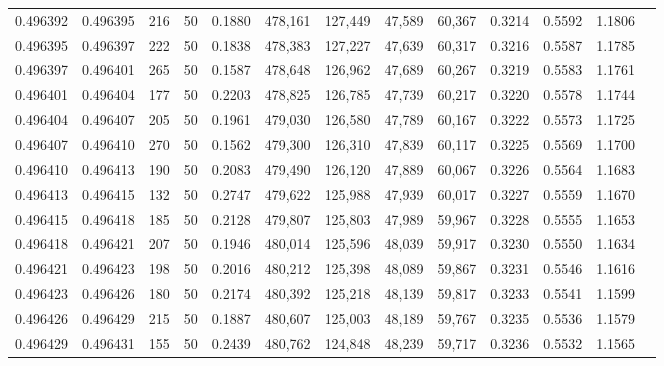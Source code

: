 \begin{tabular}{rrrrrrrrrrrrr}
0.496392 & 0.496395 &   216 &  50 &                                     0.1880 & 478,161 & 127,449 &  47,589 &  60,367 & 0.3214 & 0.5592 & 1.1806 \\
0.496395 & 0.496397 &   222 &  50 &                                     0.1838 & 478,383 & 127,227 &  47,639 &  60,317 & 0.3216 & 0.5587 & 1.1785 \\
0.496397 & 0.496401 &   265 &  50 &                                     0.1587 & 478,648 & 126,962 &  47,689 &  60,267 & 0.3219 & 0.5583 & 1.1761 \\
0.496401 & 0.496404 &   177 &  50 &                                     0.2203 & 478,825 & 126,785 &  47,739 &  60,217 & 0.3220 & 0.5578 & 1.1744 \\
0.496404 & 0.496407 &   205 &  50 &                                     0.1961 & 479,030 & 126,580 &  47,789 &  60,167 & 0.3222 & 0.5573 & 1.1725 \\
0.496407 & 0.496410 &   270 &  50 &                                     0.1562 & 479,300 & 126,310 &  47,839 &  60,117 & 0.3225 & 0.5569 & 1.1700 \\
0.496410 & 0.496413 &   190 &  50 &                                     0.2083 & 479,490 & 126,120 &  47,889 &  60,067 & 0.3226 & 0.5564 & 1.1683 \\
0.496413 & 0.496415 &   132 &  50 &                                     0.2747 & 479,622 & 125,988 &  47,939 &  60,017 & 0.3227 & 0.5559 & 1.1670 \\
0.496415 & 0.496418 &   185 &  50 &                                     0.2128 & 479,807 & 125,803 &  47,989 &  59,967 & 0.3228 & 0.5555 & 1.1653 \\
0.496418 & 0.496421 &   207 &  50 &                                     0.1946 & 480,014 & 125,596 &  48,039 &  59,917 & 0.3230 & 0.5550 & 1.1634 \\
0.496421 & 0.496423 &   198 &  50 &                                     0.2016 & 480,212 & 125,398 &  48,089 &  59,867 & 0.3231 & 0.5546 & 1.1616 \\
0.496423 & 0.496426 &   180 &  50 &                                     0.2174 & 480,392 & 125,218 &  48,139 &  59,817 & 0.3233 & 0.5541 & 1.1599 \\
0.496426 & 0.496429 &   215 &  50 &                                     0.1887 & 480,607 & 125,003 &  48,189 &  59,767 & 0.3235 & 0.5536 & 1.1579 \\
0.496429 & 0.496431 &   155 &  50 &                                     0.2439 & 480,762 & 124,848 &  48,239 &  59,717 & 0.3236 & 0.5532 & 1.1565 \\

\end{tabular}
